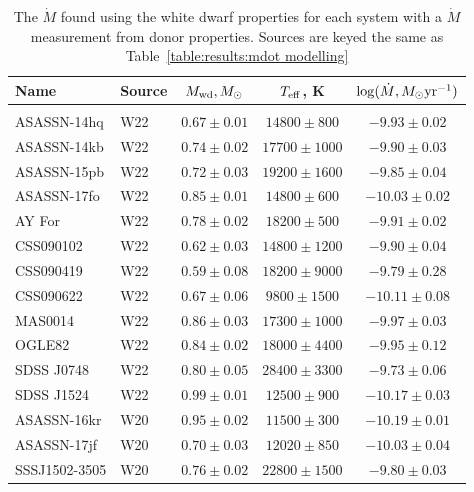 \begin{table}
    \centering
    \caption{The $\dot M$ found using the white dwarf properties for each system with a $\dot M$ measurement from donor properties. Sources are keyed the same as Table~\ref{table:results:mdot modelling}}
    \label{table:results:Mdot from white dwarf parameters}
    \begin{tabular}{llccc}
        \hline
        \textbf{Name} & \textbf{Source} & \textbf{$M_{\rm wd}, M_\odot$} & \textbf{$T_{\rm eff}$, K} & \textbf{$\log (\dot M, M_\odot {\rm yr}^{-1})$} \\
        \hline \hline \\
        ASASSN-14hq      &  W22  & $0.67 \pm 0.01$ & $14800\pm   800$ & $ -9.93 \pm 0.02$ \\
        ASASSN-14kb      &  W22  & $0.74 \pm 0.02$ & $17700\pm  1000$ & $ -9.90 \pm 0.03$ \\
        ASASSN-15pb      &  W22  & $0.72 \pm 0.03$ & $19200\pm  1600$ & $ -9.85 \pm 0.04$ \\
        ASASSN-17fo      &  W22  & $0.85 \pm 0.01$ & $14800\pm   600$ & $-10.03 \pm 0.02$ \\
        AY For           &  W22  & $0.78 \pm 0.02$ & $18200\pm   500$ & $ -9.91 \pm 0.02$ \\
        CSS090102        &  W22  & $0.62 \pm 0.03$ & $14800\pm  1200$ & $ -9.90 \pm 0.04$ \\
        CSS090419        &  W22  & $0.59 \pm 0.08$ & $18200\pm  9000$ & $ -9.79 \pm 0.28$ \\
        CSS090622        &  W22  & $0.67 \pm 0.06$ & $ 9800\pm  1500$ & $-10.11 \pm 0.08$ \\
        MAS0014          &  W22  & $0.86 \pm 0.03$ & $17300\pm  1000$ & $ -9.97 \pm 0.03$ \\
        OGLE82           &  W22  & $0.84 \pm 0.02$ & $18000\pm  4400$ & $ -9.95 \pm 0.12$ \\
        SDSS J0748       &  W22  & $0.80 \pm 0.05$ & $28400\pm  3300$ & $ -9.73 \pm 0.06$ \\
        SDSS J1524       &  W22  & $0.99 \pm 0.01$ & $12500\pm   900$ & $-10.17 \pm 0.03$ \\
        ASASSN-16kr      &  W20  & $0.95 \pm 0.02$ & $11500\pm   300$ & $-10.19 \pm 0.01$ \\
        ASASSN-17jf      &  W20  & $0.70 \pm 0.03$ & $12020\pm   850$ & $-10.03 \pm 0.04$ \\
        SSSJ1502-3505    &  W20  & $0.76 \pm 0.02$ & $22800\pm  1500$ & $ -9.80 \pm 0.03$ \\

\end{tabular}
\end{table}
